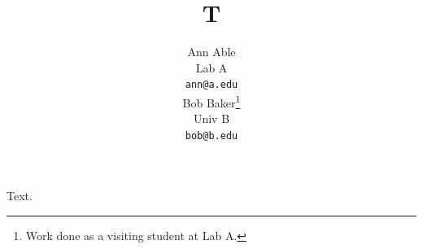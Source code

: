 \documentclass{article}
\begin{document}
\title{T}
\author{Ann Able \\ Lab A\\ \texttt{ann@a.edu} \\ \And
Bob Baker\thanks{Work done as a visiting student at Lab A.} \\ Univ B\\ \texttt{bob@b.edu} \\}
\maketitle
Text.
\end{document}
